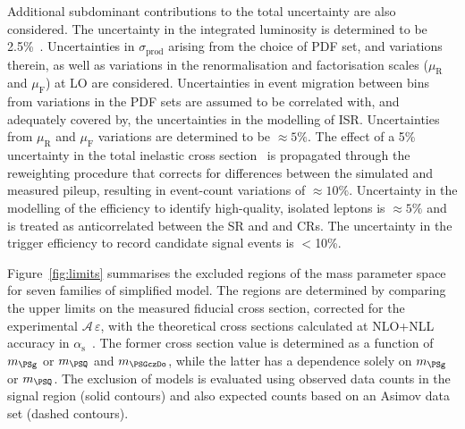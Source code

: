 Additional subdominant contributions to the total uncertainty are also
considered. The uncertainty in the integrated luminosity is determined
to be 2.5\%~\cite{CMS:2017sdi}. Uncertainties in $\sigma_\text{prod}$
arising from the choice of PDF set, and variations therein, as well as
variations in the renormalisation and factorisation scales
($\mu_\text{R}$ and $\mu_\text{F}$) at LO are
considered. Uncertainties in event migration between bins from
variations in the PDF sets are assumed to be correlated with, and
adequately covered by, the uncertainties in the modelling of
ISR. Uncertainties from $\mu_\text{R}$ and $\mu_\text{F}$ variations
are determined to be ${\approx}5\%$. The effect of a 5\% uncertainty
in the total inelastic cross section~\cite{Aaboud:2016mmw} is
propagated through the reweighting procedure that corrects for
differences between the simulated and measured pileup, resulting in
event-count variations of ${\approx}10\%$. Uncertainty in the
modelling of the efficiency to identify high-quality, isolated leptons
is ${\approx}5\%$ and is treated as anticorrelated between the SR and
\mj and \mmj CRs. The uncertainty in the trigger efficiency to record
candidate signal events is $<$10\%.


Figure~\ref{fig:limits} summarises the excluded regions of the
mass parameter space for seven families of simplified model. The
regions are determined by comparing the upper limits on the measured
fiducial cross section, corrected for the experimental
$\mathcal{A}\,\varepsilon$, with the theoretical cross sections
calculated at NLO+NLL accuracy in
$\alpha_\mathrm{s}$~\cite{susynlo}. The former cross section value is
determined as a function of $m_{\PSg}$ or $m_{\PSQ}$ and
$m_{\PSGczDo}$, while the latter has a dependence solely on $m_{\PSg}$
or $m_{\PSQ}$.  The exclusion of models is evaluated using observed
data counts in the signal region (solid contours) and also expected
counts based on an Asimov data set (dashed contours).

